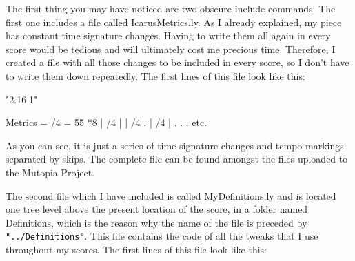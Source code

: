 \documentclass[../../LilyPond-Tutorials]{subfiles}
\begin{document}
The first thing you may have noticed are two obscure include commands. 
The first one includes a file called IcarusMetrics.ly. 
As I already explained, my piece has constant time signature changes.
Having to write them all again in every score would be tedious and will ultimately cost me precious time.
Therefore, I created a file with all those changes to be included in every score, so I don't have to write them down repeatedly.
The first lines of this file look like this:

\begin{lilypondcode}
\version "2.16.1"

Metrics = {
  /4  = 55 *8 | %
  /4  | %
   | %
  /4 . | %
  /4  | %
  .
  .
  .
  etc.
}
\end{lilypondcode}





As you can see, it is just a series of time signature changes and tempo markings separated by skips. 
The complete file can be found amongst the files uploaded to the Mutopia Project.

The second file which I have included is called MyDefinitions.ly and is located one tree level above the present location of the score, in a folder named Definitions, which is the reason why the name of the file is preceded by \verb|"../Definitions"|.
This file contains the code of all the tweaks that I use throughout my scores. 
The first lines of this file look like this:

\end{document}
